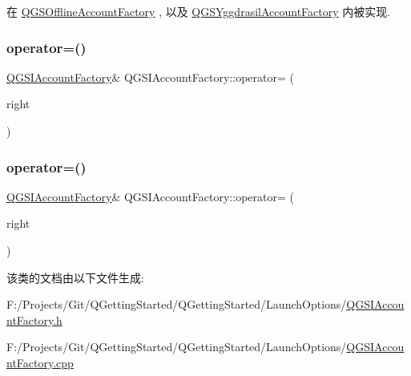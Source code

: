 在 \mbox{\hyperlink{class_q_g_s_offline_account_factory_a81a5c6a8106b0f0fd0644358b69dd925}{Q\+G\+S\+Offline\+Account\+Factory}} , 以及 \mbox{\hyperlink{class_q_g_s_yggdrasil_account_factory_a75499f69e0a7190ccd4551cbea6d935b}{Q\+G\+S\+Yggdrasil\+Account\+Factory}} 内被实现.

\mbox{\label{class_q_g_s_i_account_factory_a30f939b03d578e8d364a6db6125f5203}} 
\subsubsection{\texorpdfstring{operator=()}{operator=()}\hspace{0.1cm}{\footnotesize\ttfamily [1/2]}}
{\footnotesize\ttfamily \mbox{\hyperlink{class_q_g_s_i_account_factory}{Q\+G\+S\+I\+Account\+Factory}}\& Q\+G\+S\+I\+Account\+Factory\+::operator= (\begin{DoxyParamCaption}\item[{const \mbox{\hyperlink{class_q_g_s_i_account_factory}{Q\+G\+S\+I\+Account\+Factory}} \&}]{right }\end{DoxyParamCaption})\hspace{0.3cm}{\ttfamily [delete]}}

\mbox{\label{class_q_g_s_i_account_factory_a800ea32fa3c61d24004b22f0db23acc4}} 
\subsubsection{\texorpdfstring{operator=()}{operator=()}\hspace{0.1cm}{\footnotesize\ttfamily [2/2]}}
{\footnotesize\ttfamily \mbox{\hyperlink{class_q_g_s_i_account_factory}{Q\+G\+S\+I\+Account\+Factory}}\& Q\+G\+S\+I\+Account\+Factory\+::operator= (\begin{DoxyParamCaption}\item[{\mbox{\hyperlink{class_q_g_s_i_account_factory}{Q\+G\+S\+I\+Account\+Factory}} \&\&}]{right }\end{DoxyParamCaption})\hspace{0.3cm}{\ttfamily [delete]}}



该类的文档由以下文件生成\+:\begin{DoxyCompactItemize}
\item 
F\+:/\+Projects/\+Git/\+Q\+Getting\+Started/\+Q\+Getting\+Started/\+Launch\+Options/\mbox{\hyperlink{_q_g_s_i_account_factory_8h}{Q\+G\+S\+I\+Account\+Factory.\+h}}\item 
F\+:/\+Projects/\+Git/\+Q\+Getting\+Started/\+Q\+Getting\+Started/\+Launch\+Options/\mbox{\hyperlink{_q_g_s_i_account_factory_8cpp}{Q\+G\+S\+I\+Account\+Factory.\+cpp}}\end{DoxyCompactItemize}
